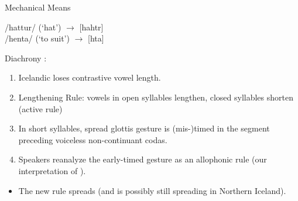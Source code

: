 \documentclass[hyperref={pdfpagelabels=false}]{beamer}
\begin{document}
\begin{frame}{Mechanical Means}

		\begin{center}
		/hattur/ (`hat') $\rightarrow$ [hahtr]\\ /henta/ (`to suit') $\rightarrow$ [h\textepsilon{}ta]
		\end{center}
		 Diachrony \citep{kristjan1980, kristjan1986}:
		\begin{enumerate}
			\item Icelandic loses contrastive vowel length.
			\item Lengthening Rule: vowels in open syllables lengthen, closed syllables shorten (active rule)
			\item In short syllables, spread glottis gesture is (mis-)timed in the segment preceding voiceless non-continuant codas.
			\item Speakers reanalyze the early-timed gesture as an allophonic rule (our interpretation of \citealt{kristjan1986}).
		\end{enumerate}
		\begin{itemize}
		\item The new rule spreads (and is possibly still spreading in Northern Iceland).
	\end{itemize}

\end{frame}
\end{document}
